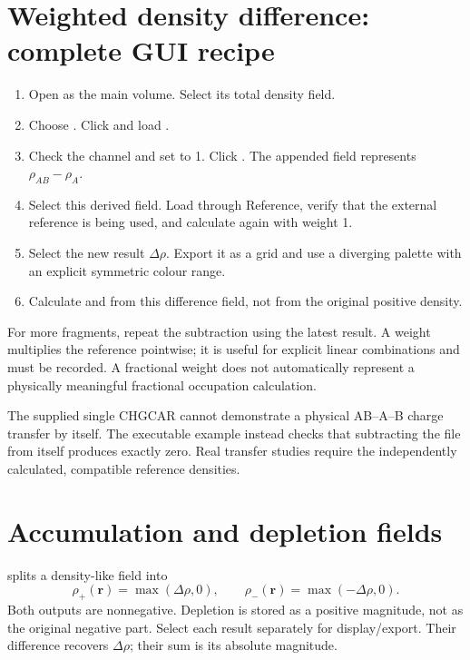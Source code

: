\section{Weighted density difference: complete GUI recipe}
\begin{enumerate}
\item Open  as the main volume. Select its total density field.
\item Choose . Click  and load .
\item Check the  channel and set  to 1. Click . The appended field represents $\rho_{AB}-\rho_A$.
\item Select this derived field. Load  through Reference, verify that the external reference is being used, and calculate again with weight 1.
\item Select the new result $\Delta\rho$. Export it as a grid and use a diverging palette with an explicit symmetric colour range.
\item Calculate  and  from this difference field, not from the original positive density.
\end{enumerate}
For more fragments, repeat the subtraction using the latest result. A weight multiplies the reference pointwise; it is useful for explicit linear combinations and must be recorded. A fractional weight does not automatically represent a physically meaningful fractional occupation calculation.

The supplied single CHGCAR cannot demonstrate a physical AB--A--B charge transfer by itself. The executable example instead checks that subtracting the file from itself produces exactly zero. Real transfer studies require the independently calculated, compatible reference densities.

\section{Accumulation and depletion fields}
 splits a density-like field into
\[
\rho_+(\mathbf r)=\max(\Delta\rho,0),\qquad
\rho_-(\mathbf r)=\max(-\Delta\rho,0).
\]
Both outputs are nonnegative. Depletion is stored as a positive magnitude, not as the original negative part. Select each result separately for display/export. Their difference recovers $\Delta\rho$; their sum is its absolute magnitude.

